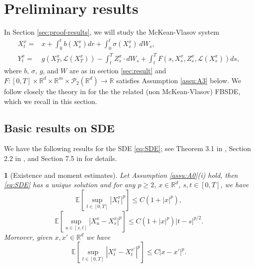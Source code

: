 \documentclass[12,english]{amsart}
\theoremstyle{plain}
\newtheorem{thm}{\protect\theoremname}
\theoremstyle{definition}
\theoremstyle{plain}
\theoremstyle{plain}
\theoremstyle{remark}
\providecommand{\theoremname}{Theorem}
\newcommand{\E}{\mathbb E}
\newcommand{\R}{\mathbb R}
\newcommand{\cL}{\mathcal L}
\newcommand{\cP}{\mathcal P}
\newcommand{\si}{\sigma}
\begin{document}
\section{Preliminary results}\label{sec:Preliminaries2} 
In Section \ref{sec:proof-results}, we will study the McKean-Vlasov system 
\begin{align}
X_t^x= & x+\int_0^tb(X_s^x)dr+\int_0^t\si(X_s^x)\ dW_s,\label{eq:SDE}\\
Y_t^x= & g(X^x_T,\cL(X^x_T))-\int_t^TZ_s^x\cdot
         dW_s+\int_t^TF(s,X_s^x,Z_s^x,\cL(X_s^x)) ds,\label{eq:BSDE}
\end{align}
where $b$, $\si$, $g$, and $W$ are as in section \ref{sec:result}
and $F:[0,T]\times\R^d\times\R^m\times\cP_2(\R^d)\to\R$
satisfies Assumption \ref{assu:A3} below. We follow closely the theory in \cite{dos2010some} for the the related (non McKean-Vlasov) FBSDE, which we recall in this section. 

\subsection{Basic  results on SDE}

We have the following results for the SDE \eqref{eq:SDE};
see Theorem 3.1 in \cite{dudley1984stochastic}, Section 2.2 in \cite{nualart2006malliavin}, and Section 7.5 in \cite{nualart2018introduction} for details.
\begin{thm}[Existence and moment estimates]
  Let Assumption \ref{assu:A0}(i) hold, then \eqref{eq:SDE} has a unique solution 
and for any $p\geq2$, $x\in\R^d$, $s,t\in[0,T]$, we have
\begin{equation}
\E[\sup_{t\in[0,T]}|X^x_t|^p]\leq C (1+|x|^p),\label{eq:D_1.2.3}
\end{equation}
\begin{equation}
\E[\sup_{u\in[s,t]}|X^x_u-X^x_s|^p]\leq C (1+|x|^p)|t-s|^{p/2}.\label{eq:D_1.2.4}
\end{equation}
Moreover, given $x,x'\in\R^d$ we have
\begin{equation}
\E[\sup_{t\in[0,T]}|X_t^x-X_t^{x'}|^p]\leq C|x-x'|^p.\label{eq:D_1.2.5}
\end{equation}
\end{thm}
\end{document}
